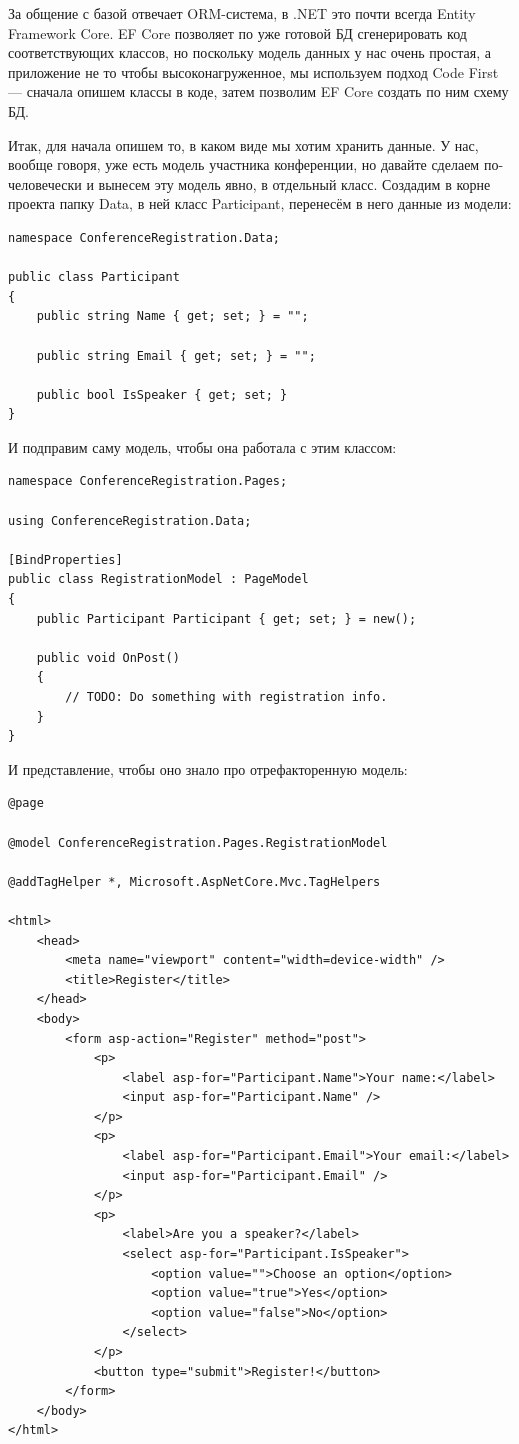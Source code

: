 \documentclass{../../text-style}
\begin{document}
За общение с базой отвечает ORM-система, в .NET это почти всегда Entity Framework Core. EF Core позволяет по уже готовой БД сгенерировать код соответствующих классов, но поскольку модель данных у нас очень простая, а приложение не то чтобы высоконагруженное, мы используем подход Code First --- сначала опишем классы в коде, затем позволим EF Core создать по ним схему БД.

Итак, для начала опишем то, в каком виде мы хотим хранить данные. У нас, вообще говоря, уже есть модель участника конференции, но давайте сделаем по-человечески и вынесем эту модель явно, в отдельный класс. Создадим в корне проекта папку Data, в ней класс Participant, перенесём в него данные из модели:

\begin{verbatim}
namespace ConferenceRegistration.Data;

public class Participant
{
    public string Name { get; set; } = "";

    public string Email { get; set; } = "";

    public bool IsSpeaker { get; set; }
}
\end{verbatim}

И подправим саму модель, чтобы она работала с этим классом:

\begin{verbatim}
namespace ConferenceRegistration.Pages;

using ConferenceRegistration.Data;

[BindProperties]
public class RegistrationModel : PageModel
{
    public Participant Participant { get; set; } = new();

    public void OnPost()
    {
        // TODO: Do something with registration info.
    }
}
\end{verbatim}

И представление, чтобы оно знало про отрефакторенную модель:

\begin{verbatim}
@page

@model ConferenceRegistration.Pages.RegistrationModel

@addTagHelper *, Microsoft.AspNetCore.Mvc.TagHelpers

<html>
    <head>
        <meta name="viewport" content="width=device-width" />
        <title>Register</title>
    </head>
    <body>
        <form asp-action="Register" method="post">
            <p>
                <label asp-for="Participant.Name">Your name:</label>
                <input asp-for="Participant.Name" />
            </p>
            <p>
                <label asp-for="Participant.Email">Your email:</label>
                <input asp-for="Participant.Email" />
            </p>
            <p>
                <label>Are you a speaker?</label>
                <select asp-for="Participant.IsSpeaker">
                    <option value="">Choose an option</option>
                    <option value="true">Yes</option>
                    <option value="false">No</option>
                </select>
            </p>
            <button type="submit">Register!</button>
        </form>
    </body>
</html>
\end{verbatim}
\end{document}
